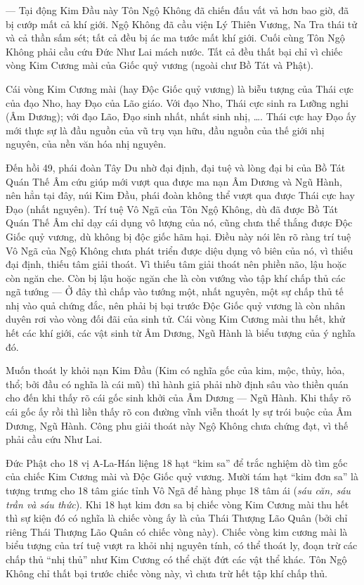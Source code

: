 — Tại động Kim Đầu này Tôn Ngộ Không đã chiến đấu vất vả hơn bao giờ, đã bị cướp mất cả khí giới. Ngộ Không đã cầu viện Lý Thiên Vương, Na Tra thái tử và cả thần sấm sét; tất cả đều bị ác ma tước mất khí giới. Cuối cùng Tôn Ngộ Không phải cầu cứu Đức Như Lai mách nước. Tất cả đều thất bại chỉ vì chiếc vòng Kim Cương mài của Giốc quỷ vương (ngoài chư Bồ Tát và Phật).

Cái vòng Kim Cương mài (hay Độc Giốc quỷ vương) là biễu tượng của Thái cực của đạo Nho, hay Đạo của Lão giáo. Với đạo Nho, Thái cực sinh ra Lưỡng nghi (Âm Dương); với đạo Lão, Đạo sinh nhất, nhất sinh nhị, \ldots. Thái cực hay Đạo ấy mới thực sự là đầu nguồn của vũ trụ vạn hữu, đầu nguồn của thế giới nhị nguyên, của nền văn hóa nhị nguyên.

Đến hồi 49, phái đoàn Tây Du nhờ đại định, đại tuệ và lòng đại bi của Bồ Tát Quán Thế Âm cứu giúp mới vượt qua được ma nạn Âm Dương và Ngũ Hành, nên hẳn tại đây, núi Kim Đầu, phái đoàn không thể vượt qua được Thái cực hay Đạo (nhất nguyên). Trí tuệ Vô Ngã của Tôn Ngộ Không, dù đã được Bồ Tát Quán Thế Âm chỉ dạy cái dụng vô lượng của nó, cũng chưa thể thắng được Độc Giốc quỷ vương, dù không bị độc giốc hãm hại. Điều này nói lên rõ ràng trí tuệ Vô Ngã của Ngộ Không chưa phát triển được diệu dụng vô biên của nó, vì thiếu đại định, thiếu tâm giải thoát. Vì thiếu tâm giải thoát nên phiền não, lậu hoặc còn ngăn che. Còn bị lậu hoặc ngăn che là còn vướng vào tập khí chấp thủ các ngã tướng — Ở đây thì chấp vào tướng một, nhất nguyên, một sự chấp thủ tế nhị vào quả chứng đắc, nên phải bị bại trước Độc Giốc quỷ vương là còn nhân duyên rơi vào vòng đối đãi của sinh tử. Cái vòng Kim Cương mài thu hết, khử hết các khí giới, các vật sinh từ Âm Dương, Ngũ Hành là biểu tượng của ý nghĩa đó.

Muốn thoát ly khỏi nạn Kim Đầu (Kim có nghĩa gốc của kim, mộc, thủy, hỏa, thổ; bởi đầu có nghĩa là cái mũ) thì hành giả phải nhờ định sâu vào thiền quán cho đến khi thấy rõ cái gốc sinh khởi của Âm Dương — Ngũ Hành. Khi thấy rõ cái gốc ấy rồi thì liền thấy rõ con đường vĩnh viễn thoát ly sự trói buộc của Âm Dương, Ngũ Hành. Công phu giải thoát này Ngộ Không chưa chứng đạt, vì thế phải cầu cứu Như Lai.

Đức Phật cho 18 vị A-La-Hán liệng 18 hạt ``kim sa'' để trắc nghiệm dò tìm gốc của chiếc Kim Cương mài và Độc Giốc quỷ vương. Mười tám hạt ``kim đơn sa'' là tượng trưng cho 18 tâm giác tỉnh Vô Ngã để hàng phục 18 tâm ái (\emph{sáu căn, sáu trần và sáu thức}). Khi 18 hạt kim đơn sa bị chiếc vòng Kim Cương mài thu hết thì sự kiện đó có nghĩa là chiếc vòng ấy là của Thái Thượng Lão Quân (bởi chỉ riêng Thái Thượng Lão Quân có chiếc vòng này). Chiếc vòng kim cương mài là biểu tượng của trí tuệ vượt ra khỏi nhị nguyên tính, có thể thoát ly, đoạn trừ các chấp thủ ``nhị thủ'' như Kim Cương có thể chặt đứt các vật thể khác. Tôn Ngộ Không chỉ thất bại trước chiếc vòng này, vì chưa trừ hết tập khí chấp thủ.

